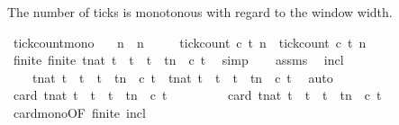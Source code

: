 \begin{isabellebody}
\begin{isamarkuptext}%
The number of ticks is monotonous with regard to the window width.%
\end{isamarkuptext}\isamarkuptrue%
\isamarkupfalse%
\ tick{\isacharunderscore}count{\isacharunderscore}mono{\isacharcolon}\isanewline
\ \ \ {\isacartoucheopen}n{\isacharprime}\ {\isasymge}\ n{\isacartoucheclose}\isanewline
\ \ \ \ \ {\isacartoucheopen}tick{\isacharunderscore}count\ c\ t\ n{\isacharprime}\ {\isasymge}\ tick{\isacharunderscore}count\ c\ t\ n{\isacartoucheclose}\isanewline
%
\isadelimproof
%
\endisadelimproof
%
\isatagproof
{}\isamarkupfalse%
\ {\isacharminus}\isanewline
\ \ \isamarkupfalse%
\ finite{\isacharcolon}\ {\isacartoucheopen}finite\ {\isacharbraceleft}t{\isacharcolon}{\isacharcolon}nat{\isachardot}\ t\ {\isasymle}\ t\ {\isasymand}\ t\ {\isacharless}\ tn{\isacharprime}\ {\isasymand}\ c\ t{\isacharbraceright}{\isacartoucheclose}\ \isamarkupfalse%
\ simp\isanewline
\ \ \isamarkupfalse%
\ assms\ \isamarkupfalse%
\ incl{\isacharcolon}\isanewline
\ \ \ \ {\isacartoucheopen}{\isacharbraceleft}t{\isacharcolon}{\isacharcolon}nat{\isachardot}\ t\ {\isasymle}\ t\ {\isasymand}\ t\ {\isacharless}\ tn\ {\isasymand}\ c\ t{\isacharbraceright}\ {\isasymsubseteq}\ {\isacharbraceleft}t{\isacharcolon}{\isacharcolon}nat{\isachardot}\ t\ {\isasymle}\ t\ {\isasymand}\ t\ {\isacharless}\ tn{\isacharprime}\ {\isasymand}\ c\ t{\isacharbraceright}{\isacartoucheclose}\ \isamarkupfalse%
\ auto\isanewline
\ \ \isamarkupfalse%
\ {\isacartoucheopen}card\ {\isacharbraceleft}t{\isacharcolon}{\isacharcolon}nat{\isachardot}\ t\ {\isasymle}\ t\ {\isasymand}\ t\ {\isacharless}\ tn\ {\isasymand}\ c\ t{\isacharbraceright}\isanewline
\ \ \ \ \ \ \ \ {\isasymle}\ card\ {\isacharbraceleft}t{\isacharcolon}{\isacharcolon}nat{\isachardot}\ t\ {\isasymle}\ t\ {\isasymand}\ t\ {\isacharless}\ tn{\isacharprime}\ {\isasymand}\ c\ t{\isacharbraceright}{\isacartoucheclose}\isanewline
\ \ \ \ \isamarkupfalse%
\ card{\isacharunderscore}mono{\isacharbrackleft}OF\ finite\ incl{\isacharbrackright}\ \isacommand{{\isachardot}}\isamarkupfalse%

\end{isabellebody}
